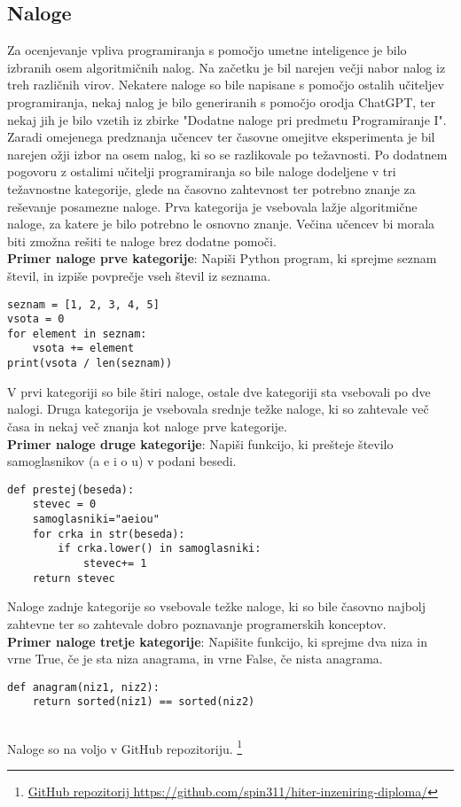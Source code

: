 \documentclass[a4paper,12pt,openright]{book}
\begin{document}
\subsection{Naloge}
Za ocenjevanje vpliva programiranja s pomočjo umetne inteligence je bilo izbranih osem algoritmičnih nalog.
Na začetku je bil narejen večji nabor nalog iz treh različnih virov. Nekatere naloge so bile napisane s pomočjo ostalih učiteljev programiranja, nekaj nalog je bilo generiranih s pomočjo orodja ChatGPT, ter nekaj jih je bilo vzetih iz zbirke "Dodatne naloge pri predmetu Programiranje I". \cite{dodatneNaloge} \\
Zaradi omejenega predznanja učencev ter časovne omejitve eksperimenta je bil narejen ožji izbor na osem nalog, ki so se razlikovale po težavnosti. Po dodatnem pogovoru z ostalimi učitelji programiranja so bile naloge dodeljene v tri težavnostne kategorije, glede na časovno zahtevnost ter potrebno znanje za reševanje posamezne naloge. Prva kategorija je vsebovala lažje algoritmične naloge, za katere je bilo potrebno le osnovno znanje. Večina učencev bi morala biti zmožna rešiti te naloge brez dodatne pomoči.
\\
\textbf{Primer naloge prve kategorije}:
Napiši Python program, ki sprejme seznam števil, in izpiše povprečje vseh števil iz seznama.
\begin{lstlisting}[style=python]
seznam = [1, 2, 3, 4, 5]
vsota = 0
for element in seznam:
    vsota += element
print(vsota / len(seznam))
\end{lstlisting}
    

V prvi kategoriji so bile štiri naloge, ostale dve kategoriji sta vsebovali po dve nalogi. Druga kategorija je vsebovala srednje težke naloge, ki so zahtevale več časa  in nekaj več znanja kot naloge prve kategorije. 
\\
\textbf{Primer naloge druge kategorije}:
Napiši funkcijo, ki prešteje število samoglasnikov (a e i o u) v podani besedi.
\begin{lstlisting}[style=python]
def prestej(beseda):
    stevec = 0
    samoglasniki="aeiou"
    for crka in str(beseda):
        if crka.lower() in samoglasniki:
            stevec+= 1
    return stevec
\end{lstlisting}
Naloge zadnje kategorije so vsebovale težke naloge, ki so bile časovno najbolj zahtevne ter so zahtevale dobro poznavanje programerskih konceptov.
\\
\textbf{Primer naloge tretje kategorije}:
Napišite funkcijo, ki sprejme dva niza in vrne True, če je sta niza anagrama, in vrne False, če nista anagrama.
\pagebreak
\begin{lstlisting}[style=python]
def anagram(niz1, niz2):
    return sorted(niz1) == sorted(niz2)
    
\end{lstlisting}
Naloge so na voljo v GitHub repozitoriju.
\footnote{\href{https://github.com/spin311/hiter-inzeniring-diploma/}{GitHub repozitorij https://github.com/spin311/hiter-inzeniring-diploma/}}
\end{document}
